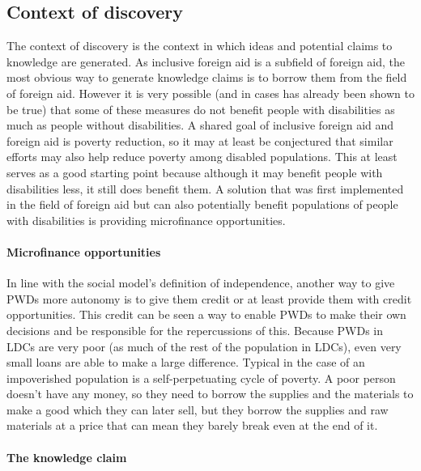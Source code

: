 \documentclass[a4paper]{article}
\begin{document}
\subsection{Context of discovery}

The context of discovery is the context in which ideas and potential claims to
knowledge are generated. As inclusive foreign aid is a subfield of foreign
aid, the most obvious way to generate knowledge claims is to borrow them from
the field of foreign aid. However it is very possible (and in cases has
already been shown to be true) that some of these measures do not benefit
people with disabilities as much as people without disabilities. A shared goal
of inclusive foreign aid and foreign aid is poverty reduction, so it may at
least be conjectured that similar efforts may also help reduce poverty among
disabled populations. This at least serves as a good starting point because
although it may benefit people with disabilities less, it still does benefit
them. A solution that was first implemented in the field of foreign aid but
can also potentially benefit populations of people with disabilities is
providing microfinance opportunities.

\paragraph{Microfinance opportunities}

In line with the social model's definition of independence, another way to
give PWDs more autonomy is to give them credit or at least provide them with
credit opportunities. This credit can be seen a way to enable PWDs to make
their own decisions and be responsible for the repercussions of this. Because
PWDs in LDCs are very poor (as much of the rest of the population in LDCs),
even very small loans are able to make a large difference. Typical in the case
of an impoverished population is a self-perpetuating cycle of poverty. A poor
person doesn't have any money, so they need to borrow the supplies and the
materials to make a good which they can later sell, but they borrow the
supplies and raw materials at a price that can mean they barely break even at
the end of it.

\paragraph{The knowledge claim}
\end{document}
